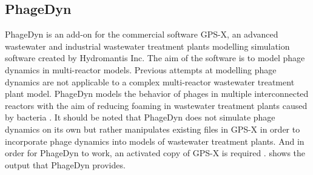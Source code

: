 \subsection{PhageDyn}
PhageDyn is an add-on for the commercial software GPS-X, an advanced wastewater and industrial wastewater treatment plants modelling simulation software created by Hydromantis Inc. 
The aim of the software is to model phage dynamics in multi-reactor models. 
Previous attempts at modelling phage dynamics are not applicable to a complex multi-reactor wastewater treatment plant model. 
PhageDyn models the behavior of phages in multiple interconnected reactors with the aim of reducing foaming in wastewater treatment plants caused by bacteria \cite{heardEffectFilamentousBacteria2008}. 
It should be noted that PhageDyn does not simulate phage dynamics on its own but rather manipulates existing files in GPS-X in order to incorporate phage dynamics into models of wastewater treatment plants. 
And in order for PhageDyn to work, an activated copy of GPS-X is required \cite{krysiak-baltynSimulationPhageDynamics2017}. 
 shows the output that PhageDyn provides. 
